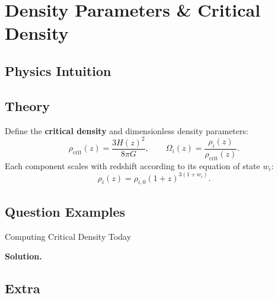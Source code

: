 \documentclass[12pt, a4paper, openright]{report}
\begin{document}
\section{Density Parameters \& Critical Density}

\subsection{Physics Intuition}

\begin{intuition}
\lipsum[17][1-4]   %
\end{intuition}

\subsection{Theory}

\begin{theory}
Define the \textbf{critical density} and dimensionless density parameters:
\begin{equation}
  \rho_\mathrm{crit}(z) = \frac{3H(z)^2}{8\pi G}, \qquad
  \Omega_i(z) = \frac{\rho_i(z)}{\rho_{\mathrm{crit}}(z)}.
\end{equation}
Each component scales with redshift according to its equation of state $w_i$:
\begin{equation}
  \rho_i(z) = \rho_{i,0}(1+z)^{3(1+w_i)}.
\end{equation}

\lipsum[18][1-3]   %
\end{theory}

\subsection{Question Examples}

\begin{example}{Computing Critical Density Today}{}
\lipsum[19][1-2]   %

\medskip\textbf{Solution.}\quad
\lipsum[19][3-4]   %
\end{example}

\subsection{Extra}

\begin{extra}
\lipsum[20][1-2]   %
\end{extra}
\end{document}
